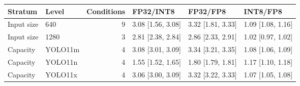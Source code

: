 \begin{tabular}{llrlll}
\toprule
Stratum & Level & Conditions & FP32/INT8 & FP32/FP8 & INT8/FP8 \\
\midrule
Input size & 640 & 9 & 3.08 [1.56, 3.08] & 3.32 [1.81, 3.33] & 1.09 [1.08, 1.16] \\
Input size & 1280 & 3 & 2.81 [2.38, 2.84] & 2.86 [2.33, 2.91] & 1.02 [0.97, 1.02] \\
Capacity & YOLO11m & 4 & 3.08 [3.01, 3.09] & 3.34 [3.21, 3.35] & 1.08 [1.06, 1.09] \\
Capacity & YOLO11n & 4 & 1.55 [1.52, 1.65] & 1.80 [1.79, 1.81] & 1.17 [1.10, 1.18] \\
Capacity & YOLO11x & 4 & 3.06 [3.00, 3.09] & 3.32 [3.22, 3.33] & 1.07 [1.05, 1.08] \\
\bottomrule
\end{tabular}
